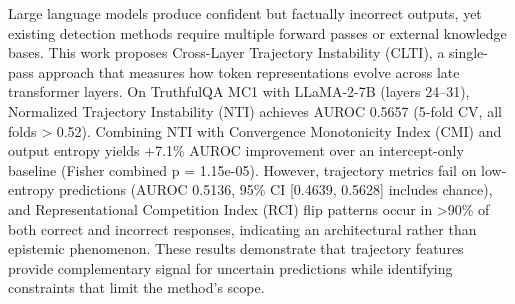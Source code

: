 
Large language models produce confident but factually incorrect outputs, yet existing detection methods require multiple forward passes or external knowledge bases. This work proposes Cross-Layer Trajectory Instability (CLTI), a single-pass approach that measures how token representations evolve across late transformer layers. On TruthfulQA MC1 with LLaMA-2-7B (layers 24--31), Normalized Trajectory Instability (NTI) achieves AUROC 0.5657 (5-fold CV, all folds > 0.52). Combining NTI with Convergence Monotonicity Index (CMI) and output entropy yields +7.1\% AUROC improvement over an intercept-only baseline (Fisher combined p = 1.15e-05). However, trajectory metrics fail on low-entropy predictions (AUROC 0.5136, 95\% CI [0.4639, 0.5628] includes chance), and Representational Competition Index (RCI) flip patterns occur in >90\% of both correct and incorrect responses, indicating an architectural rather than epistemic phenomenon. These results demonstrate that trajectory features provide complementary signal for uncertain predictions while identifying constraints that limit the method's scope.

